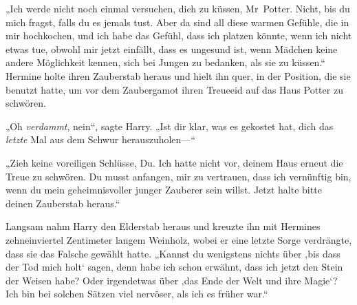 „Ich werde nicht noch einmal versuchen, dich zu küssen, Mr~Potter. Nicht, bis du mich fragst, falls du es jemals tust. Aber da sind all diese warmen Gefühle, die in mir hochkochen, und ich habe das Gefühl, dass ich platzen könnte, wenn ich nicht etwas tue, obwohl mir jetzt einfällt, dass es ungesund ist, wenn Mädchen keine andere Möglichkeit kennen, sich bei Jungen zu bedanken, als sie zu küssen.“
Hermine holte ihren Zauberstab heraus und hielt ihn quer, in der Position, die sie benutzt hatte, um vor dem Zaubergamot ihren Treueeid auf das Haus Potter zu schwören.

„Oh \emph{verdammt}, nein“, sagte Harry. „Ist dir klar, was es gekostet hat, dich das \emph{letzte} Mal aus dem Schwur herauszuholen—“

„Zieh keine voreiligen Schlüsse, Du. Ich hatte nicht vor, deinem Haus erneut die Treue zu schwören. Du musst anfangen, mir zu vertrauen, dass ich vernünftig bin, wenn du mein geheimnisvoller junger Zauberer sein willst. Jetzt halte bitte deinen Zauberstab heraus.“

Langsam nahm Harry den Elderstab heraus und kreuzte ihn mit Hermines zehneinviertel Zentimeter langem Weinholz, wobei er eine letzte Sorge verdrängte, dass sie das Falsche gewählt hatte.
„Kannst du wenigstens nichts über ‚bis dass der Tod mich holt‘ sagen, denn habe ich schon erwähnt, dass ich jetzt den Stein der Weisen habe? Oder irgendetwas über ‚das Ende der Welt und ihre Magie‘? Ich bin bei solchen Sätzen viel nervöser, als ich es früher war.“

